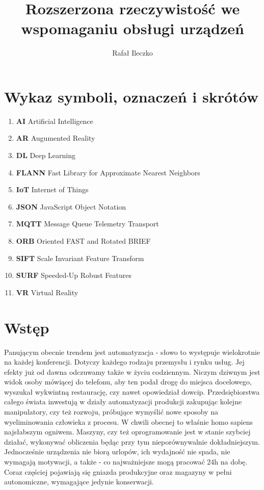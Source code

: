 \documentclass[12pt,twoside,polish]{article}
\author{Rafał Ileczko}
\title{Rozszerzona rzeczywistość we wspomaganiu obsługi urządzeń}
\begin{document}
\maketitle

\blankpage

\tableofcontents

\clearpage
\blankpage


\section*{Wykaz symboli, oznaczeń i skrótów}
\begin{enumerate}
	\item[] \textbf{AI} Artificial Intelligence
	\item[] \textbf{AR} Augumented Reality
	\item[] \textbf{DL} Deep Learning
	\item[] \textbf{FLANN} Fast Library for Approximate Nearest Neighbors
	\item[] \textbf{IoT} Internet of Things
	\item[] \textbf{JSON} JavaScript Object Notation
	\item[] \textbf{MQTT} Message Queue Telemetry Transport
	\item[] \textbf{ORB} Oriented FAST and Rotated BRIEF
	\item[] \textbf{SIFT} Scale Invariant Feature Transform
	\item[] \textbf{SURF}  Speeded-Up Robust Features
	\item[] \textbf{VR} Virtual Reality
\end{enumerate}

%



\clearpage


\section{Wstęp}

Panującym obecnie trendem jest automatyzacja - słowo to występuje wielokrotnie na każdej konferencji. Dotyczy każdego rodzaju przemysłu i rynku usług. Jej efekty już od dawna odczuwamy także w życiu codziennym. Niczym dziwnym jest widok osoby mówiącej do telefonu, aby ten podał drogę do miejsca docelowego, wyszukał wykwintną restaurację, czy nawet opowiedział dowcip. Przedsiębiorstwa całego świata inwestują w działy automatyzacji produkcji zakupując kolejne manipulatory, czy też rozwoju, próbujące wymyślić nowe sposoby na wyeliminowania człowieka z procesu. W chwili obecnej to właśnie homo sapiens najsłabszym ogniwem. Maszyny, czy też oprogramowanie jest w stanie szybciej działać, wykonywać obliczenia będąc przy tym nieporównywalnie dokładniejszym. Jednocześnie urządzenia nie biorą urlopów, ich wydajność nie spada, nie wymagają motywacji, a także - co najważniejsze  mogą pracować 24h na dobę. Coraz częściej pojawiają się gniazda produkcyjne oraz magazyny w pełni autonomiczne, wymagające jedynie konserwacji.
\end{document}
